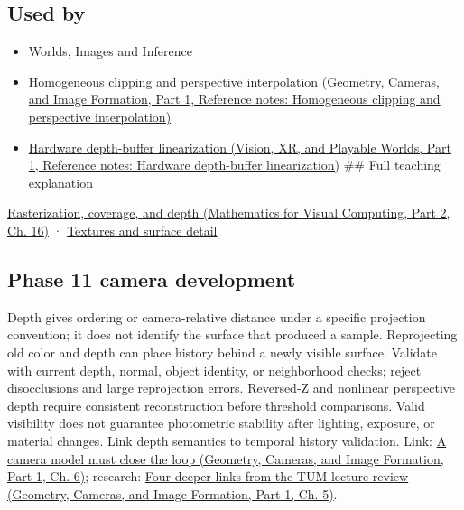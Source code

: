 \subsection{Used by}\label{appendix-97578ed97952-used-by}

\hypertarget{appendix-97578ed97952-used-by}{}

\begin{itemize}
\item
  {Worlds, Images and Inference}
\item
  \href{../03-Geometry-Cameras-and-Image-Formation-P01/main.pdf\#nameddest=appendix-40426e4b2103}{Homogeneous clipping and perspective interpolation (Geometry, Cameras, and Image Formation, Part 1, Reference notes: Homogeneous clipping and perspective interpolation)}
\item
  \href{../07-Vision-XR-and-Playable-Worlds-P01/main.pdf\#nameddest=appendix-1bc40b08db4a}{Hardware depth-buffer linearization (Vision, XR, and Playable Worlds, Part 1, Reference notes: Hardware depth-buffer linearization)} \#\# Full teaching explanation
\end{itemize}

\href{../02-Mathematics-for-Visual-Computing-P02/main.pdf\#nameddest=03-visual-computing-i-ch012-rasterization-coverage-and-depth}{Rasterization, coverage, and depth (Mathematics for Visual Computing, Part 2, Ch. 16)} · \hyperref[03-visual-computing-i-ch019-textures-and-surface-detail]{Textures and surface detail}

\subsection{Phase 11 camera development}\label{appendix-97578ed97952-phase-11-camera-development}

\hypertarget{appendix-97578ed97952-phase-11-camera-development}{}

Depth gives ordering or camera-relative distance under a specific projection convention; it does not identify the surface that produced a sample. Reprojecting old color and depth can place history behind a newly visible surface. Validate with current depth, normal, object identity, or neighborhood checks; reject disocclusions and large reprojection errors. Reversed-Z and nonlinear perspective depth require consistent reconstruction before threshold comparisons. Valid visibility does not guarantee photometric stability after lighting, exposure, or material changes. Link depth semantics to temporal history validation. Link: \href{../03-Geometry-Cameras-and-Image-Formation-P01/main.pdf\#nameddest=02-foundations-ii-ch037-a-camera-model-must-close-the-loop}{A camera model must close the loop (Geometry, Cameras, and Image Formation, Part 1, Ch. 6)}; research: \href{../03-Geometry-Cameras-and-Image-Formation-P01/main.pdf\#nameddest=02-foundations-ii-ch036-four-deeper-links-from-the-tum-lecture-review}{Four deeper links from the TUM lecture review (Geometry, Cameras, and Image Formation, Part 1, Ch. 5)}.

